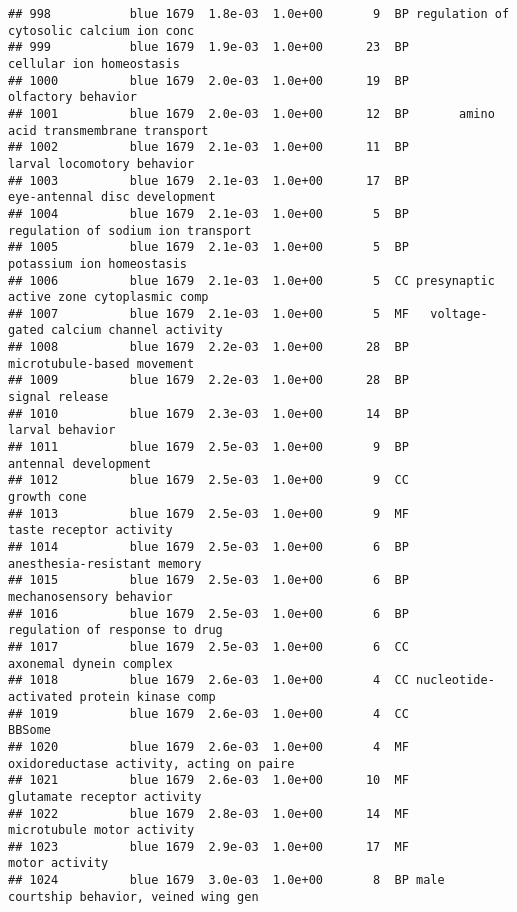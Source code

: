 \documentclass[]{article}
\begin{document}
\begin{verbatim}
## 998           blue 1679  1.8e-03  1.0e+00       9  BP regulation of cytosolic calcium ion conc
## 999           blue 1679  1.9e-03  1.0e+00      23  BP                 cellular ion homeostasis
## 1000          blue 1679  2.0e-03  1.0e+00      19  BP                       olfactory behavior
## 1001          blue 1679  2.0e-03  1.0e+00      12  BP       amino acid transmembrane transport
## 1002          blue 1679  2.1e-03  1.0e+00      11  BP               larval locomotory behavior
## 1003          blue 1679  2.1e-03  1.0e+00      17  BP            eye-antennal disc development
## 1004          blue 1679  2.1e-03  1.0e+00       5  BP       regulation of sodium ion transport
## 1005          blue 1679  2.1e-03  1.0e+00       5  BP                potassium ion homeostasis
## 1006          blue 1679  2.1e-03  1.0e+00       5  CC presynaptic active zone cytoplasmic comp
## 1007          blue 1679  2.1e-03  1.0e+00       5  MF   voltage-gated calcium channel activity
## 1008          blue 1679  2.2e-03  1.0e+00      28  BP               microtubule-based movement
## 1009          blue 1679  2.2e-03  1.0e+00      28  BP                           signal release
## 1010          blue 1679  2.3e-03  1.0e+00      14  BP                          larval behavior
## 1011          blue 1679  2.5e-03  1.0e+00       9  BP                     antennal development
## 1012          blue 1679  2.5e-03  1.0e+00       9  CC                              growth cone
## 1013          blue 1679  2.5e-03  1.0e+00       9  MF                  taste receptor activity
## 1014          blue 1679  2.5e-03  1.0e+00       6  BP              anesthesia-resistant memory
## 1015          blue 1679  2.5e-03  1.0e+00       6  BP                  mechanosensory behavior
## 1016          blue 1679  2.5e-03  1.0e+00       6  BP           regulation of response to drug
## 1017          blue 1679  2.5e-03  1.0e+00       6  CC                  axonemal dynein complex
## 1018          blue 1679  2.6e-03  1.0e+00       4  CC nucleotide-activated protein kinase comp
## 1019          blue 1679  2.6e-03  1.0e+00       4  CC                                   BBSome
## 1020          blue 1679  2.6e-03  1.0e+00       4  MF oxidoreductase activity, acting on paire
## 1021          blue 1679  2.6e-03  1.0e+00      10  MF              glutamate receptor activity
## 1022          blue 1679  2.8e-03  1.0e+00      14  MF               microtubule motor activity
## 1023          blue 1679  2.9e-03  1.0e+00      17  MF                           motor activity
## 1024          blue 1679  3.0e-03  1.0e+00       8  BP male courtship behavior, veined wing gen

\end{verbatim}
\end{document}
